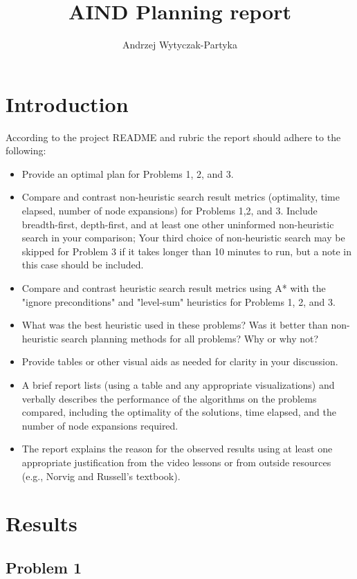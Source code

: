 \documentclass[12pt, a4paper]{article}
\author{Andrzej Wytyczak-Partyka}
\title{AIND Planning report}
\begin{document}
\maketitle

\section{Introduction}

According to the project README and rubric the report should adhere to the following:

\begin{itemize}

\item Provide an optimal plan for Problems 1, 2, and 3.
\item Compare and contrast non-heuristic search result metrics (optimality, time elapsed, number of node expansions) for Problems 1,2, and 3. Include breadth-first, depth-first, and at least one other uninformed non-heuristic search in your comparison; Your third choice of non-heuristic search may be skipped for Problem 3 if it takes longer than 10 minutes to run, but a note in this case should be included.
\item Compare and contrast heuristic search result metrics using A* with the "ignore preconditions" and "level-sum" heuristics for Problems 1, 2, and 3.
\item What was the best heuristic used in these problems? Was it better than non-heuristic search planning methods for all problems? Why or why not?
\item Provide tables or other visual aids as needed for clarity in your discussion.
\item A brief report lists (using a table and any appropriate visualizations) and verbally describes the performance of the algorithms on the problems compared, including the optimality of the solutions, time elapsed, and the number of node expansions required.
\item The report explains the reason for the observed results using at least one appropriate justification from the video lessons or from outside resources (e.g., Norvig and Russell’s textbook).
\end{itemize}

\section{Results}


\subsection{Problem 1}
\end{document}
